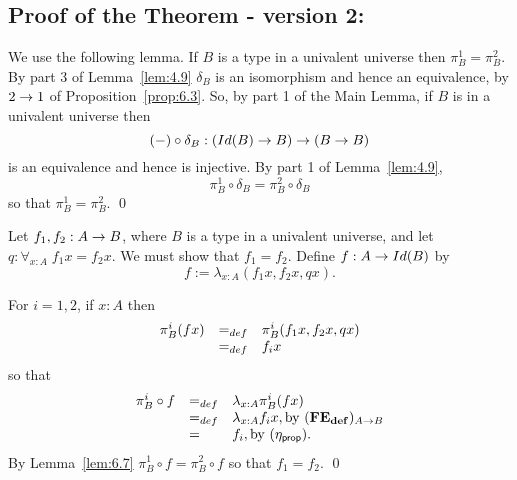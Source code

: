 \subsection{Proof of the Theorem - version 2: } 

We use the following lemma.
\label{fe:lem-projs}\label{lem:6.7}
If $B$ is a type in a univalent universe then $\pi^1_B = \pi^2_B$.
\proof By part 3 of Lemma~\ref{lem:4.9} $\delta_B$ is an isomorphism and hence an equivalence, by $2\ra 1$ of Proposition~\ref{prop:6.3}.  So, by part 1 of the Main Lemma, if $B$ is in a univalent universe then
  \[ (-)\circ\delta_B : (Id(B)\ra B)\ra (B\ra B)\]
is an equivalence and hence is injective.  By part 1 of Lemma~\ref{lem:4.9},
  \[ \pi^1_B\circ\delta_B = \pi^2_B\circ\delta_B\]
so that $\pi^1_B=\pi^2_B$.
\qed


Let $f_1,f_2:A\ra B$, where $B$ is a type in a univalent universe, and let 
$q:\forall_{x:A}\; f_1x=f_2x$.  We must show that $f_1=f_2$.
Define $f:A\ra Id(B)$ by
  \[ f := \lambda_{x:A}(f_1x,f_2x,qx).\]

For $i=1,2$, if $x:A$ then
  \[\be{array}{lll}
\pi^i_B(fx)&=_{def}&\pi^i_B(f_1x,f_2x,qx)\\
           &=_{def}& f_ix
  \en{array}\]
so that
  \[\be{array}{lll}
\pi^i_B\circ f&=_{def}& \lambda_{x:A}\pi^i_B(fx)\\
           &=_{def}& \lambda_{x:A}f_ix,\mbox{by } {\bf (FE_{def}})_{A\ra B}\\
           &=& f_i,\mbox{by }{(\eta_{\sf prop})}.
  \en{array}\]
By Lemma~\ref{lem:6.7} $\pi^1_B\circ f = \pi^2_B\circ f$ so that $f_1=f_2$.
\qed
